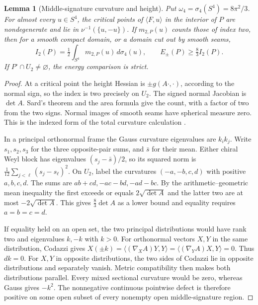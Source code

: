 \documentclass[11pt,letterpaper]{article}
\numberwithin{equation}{section}
\newtheorem{lemma}[theorem]{Lemma}
\theoremstyle{definition}
\begin{document}
\begin{lemma}[Middle-signature curvature and height]\label{lem:area}
Put \(\omega_4=\sigma_4(S^4)=8\pi^2/3\). For almost every
\(u\in S^4\), the critical points of \(\langle F,u\rangle\) in the
interior of \(P\) are nondegenerate and lie in \(\nu^{-1}(\{u,-u\})\).
If \(m_{2,P}(u)\) counts those of index two, then for a smooth compact
domain, or a domain cut out by smooth seams,
\[
 I_2(P)=\tfrac12\int_{S^4}m_{2,P}(u)\,d\sigma_4(u),
 \qquad E_\pm(P)\ge\tfrac83 I_2(P).
\]
If \(P^\circ\cap U_2\ne\varnothing\), the energy comparison is strict.
\end{lemma}

\begin{proof}
At a critical point the height Hessian is \(\pm g(A\cdot,\cdot)\),
according to the normal sign, so the index is two precisely on
\(U_2\). The signed normal Jacobian is \(\det A\). Sard's theorem
and the area formula give the count, with a factor of two from the
two signs. Normal images of smooth seams have spherical measure
zero. This is the indexed form of the total curvature calculation
\cite{ChernLashof1957Curvature,OntiVlachos2017Hypersurfaces}.

In a principal orthonormal frame the Gauss curvature eigenvalues
are \(k_i k_j\). Write \(s_1,s_2,s_3\) for the three opposite-pair
sums, and \(\bar s\) for their mean. Either chiral Weyl block has
eigenvalues \((s_j-\bar s)/2\), so its squared norm is
\(\frac1{12}\sum_{j<\ell}(s_j-s_\ell)^2\).
On \(U_2\), label the curvatures \((-a,-b,c,d)\) with positive
\(a,b,c,d\). The sums are \(ab+cd,-ac-bd,-ad-bc\).
By the arithmetic--geometric mean inequality the first exceeds
or equals \(2\sqrt{\det A}\) and the latter two are at most
\(-2\sqrt{\det A}\). This gives \(\frac83\det A\) as a lower
bound and equality requires \(a=b=c=d\).

If equality held on an open set, the two principal distributions
would have rank two and eigenvalues \(k,-k\) with \(k>0\). For
orthonormal vectors \(X,Y\) in the same distribution, Codazzi gives
\(X(\pm k)=\langle(\nabla_X A)Y,Y\rangle
=\langle(\nabla_Y A)X,Y\rangle=0\).
Thus \(dk=0\). For \(X,Y\) in opposite distributions, the two
sides of Codazzi lie in opposite distributions and separately
vanish. Metric compatibility then makes both distributions
parallel. Every mixed sectional curvature would be zero, whereas
Gauss gives \(-k^2\). The nonnegative continuous pointwise defect
is therefore positive on some open subset of every nonempty
open middle-signature region.
\end{proof}
\end{document}
